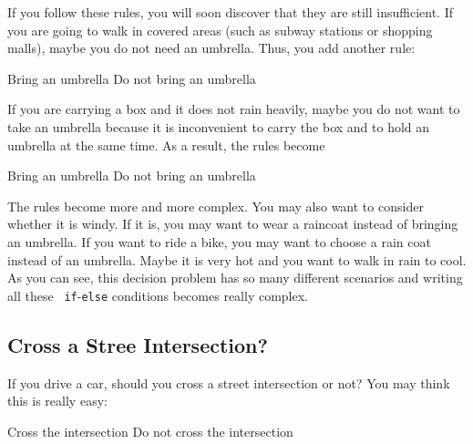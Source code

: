 If you follow these rules, you will soon discover that they are still
insufficient.  If you are going to walk in covered areas (such as
subway stations or shopping malls), maybe you do not need an umbrella.
Thus, you add another rule:

\begin{algorithm}
    \begin{algorithmic}[1]
      \State Bring an umbrella
      \Else
      \State Do not bring an umbrella
      \EndIf
    \end{algorithmic}
\end{algorithm}


If you are carrying a box and it does not rain heavily, maybe you
do not want to take an umbrella because it is inconvenient to carry
the box and to hold an umbrella at the same time. As a result,
the rules become

\begin{algorithm}
    \begin{algorithmic}[1]
      \State Bring an umbrella
      \Else
      \State Do not bring an umbrella
      \EndIf
    \end{algorithmic}
\end{algorithm}

The rules become more and more complex.  You may also want to consider
whether it is windy. If it is, you may want to wear a raincoat instead
of bringing an umbrella. If you want to ride a bike, you may want to
choose a rain coat instead of an umbrella.  Maybe it is very hot and
you want to walk in rain to cool.  As you can see, this decision
problem has so many different scenarios and writing all these {\tt
  if}-{\tt else} conditions becomes really complex.

\subsection{Cross a Stree Intersection?}

If you drive a car, should you cross a street intersection or not?
You may think this is really easy:

\begin{algorithm}
    \begin{algorithmic}[1]
      \State Cross the intersection
      \Else
      \State Do not cross the intersection
      \EndIf
    \end{algorithmic}
\end{algorithm}

